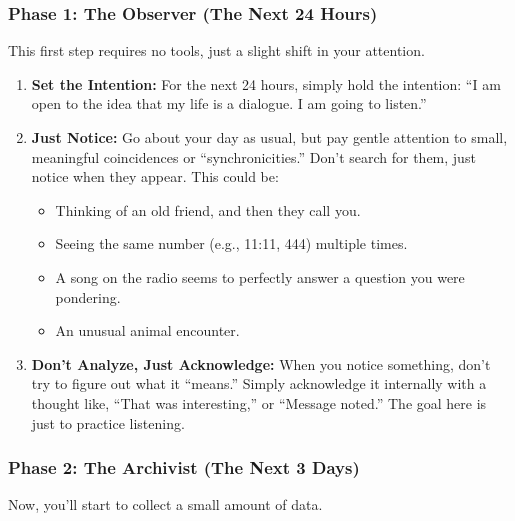 \documentclass{article}
\begin{document}
\subsubsection*{Phase 1: The Observer (The Next 24 Hours)}\label{phase-1-the-observer-the-next-24-hours}

This first step requires no tools, just a slight shift in your attention.

\begin{enumerate}
\item
  \textbf{Set the Intention:} For the next 24 hours, simply hold the intention: ``I am open to the idea that my life is a dialogue. I am going to listen.''
\item
  \textbf{Just Notice:} Go about your day as usual, but pay gentle attention to small, meaningful coincidences or ``synchronicities.'' Don't search for them, just notice when they appear. This could be:

  \begin{itemize}
  \item
    Thinking of an old friend, and then they call you.
  \item
    Seeing the same number (e.g., 11:11, 444) multiple times.
  \item
    A song on the radio seems to perfectly answer a question you were pondering.
  \item
    An unusual animal encounter.
  \end{itemize}
\item
  \textbf{Don't Analyze, Just Acknowledge:} When you notice something, don't try to figure out what it ``means.'' Simply acknowledge it internally with a thought like, ``That was interesting,'' or ``Message noted.'' The goal here is just to practice listening.
\end{enumerate}

\subsubsection*{Phase 2: The Archivist (The Next 3 Days)}\label{phase-2-the-archivist-the-next-3-days}

Now, you'll start to collect a small amount of data.
\end{document}
